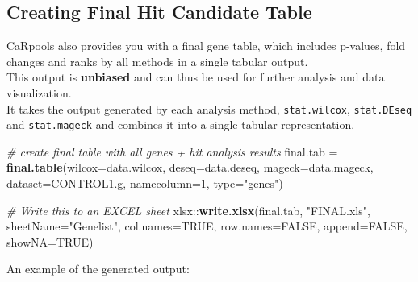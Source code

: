 \documentclass[]{article}
\newenvironment{Shaded}{\begin{snugshade}}{\end{snugshade}}
\newcommand{\KeywordTok}[1]{\textcolor[rgb]{0.13,0.29,0.53}{\textbf{{#1}}}}
\newcommand{\DataTypeTok}[1]{\textcolor[rgb]{0.13,0.29,0.53}{{#1}}}
\newcommand{\DecValTok}[1]{\textcolor[rgb]{0.00,0.00,0.81}{{#1}}}
\newcommand{\StringTok}[1]{\textcolor[rgb]{0.31,0.60,0.02}{{#1}}}
\newcommand{\CommentTok}[1]{\textcolor[rgb]{0.56,0.35,0.01}{\textit{{#1}}}}
\newcommand{\OtherTok}[1]{\textcolor[rgb]{0.56,0.35,0.01}{{#1}}}
\newcommand{\NormalTok}[1]{{#1}}
\begin{document}
\subsection{Creating Final Hit Candidate
Table}\label{creating-final-hit-candidate-table}

CaRpools also provides you with a final gene table, which includes
p-values, fold changes and ranks by all methods in a single tabular
output.\\
This output is \textbf{unbiased} and can thus be used for further
analysis and data visualization.\\
It takes the output generated by each analysis method,
\texttt{stat.wilcox}, \texttt{stat.DEseq} and \texttt{stat.mageck} and
combines it into a single tabular representation.

\begin{Shaded}
\begin{Highlighting}[]
\CommentTok{# create final table with all genes + hit analysis results}
\NormalTok{final.tab =}\StringTok{ }\KeywordTok{final.table}\NormalTok{(}\DataTypeTok{wilcox=}\NormalTok{data.wilcox, }\DataTypeTok{deseq=}\NormalTok{data.deseq, }\DataTypeTok{mageck=}\NormalTok{data.mageck, }\DataTypeTok{dataset=}\NormalTok{CONTROL1.g, }\DataTypeTok{namecolumn=}\DecValTok{1}\NormalTok{, }\DataTypeTok{type=}\StringTok{"genes"}\NormalTok{)}

\CommentTok{# Write this to an EXCEL sheet}
\NormalTok{xlsx::}\KeywordTok{write.xlsx}\NormalTok{(final.tab, }\StringTok{"FINAL.xls"}\NormalTok{, }\DataTypeTok{sheetName=}\StringTok{"Genelist"}\NormalTok{, }
  \DataTypeTok{col.names=}\OtherTok{TRUE}\NormalTok{, }\DataTypeTok{row.names=}\OtherTok{FALSE}\NormalTok{, }\DataTypeTok{append=}\OtherTok{FALSE}\NormalTok{, }\DataTypeTok{showNA=}\OtherTok{TRUE}\NormalTok{)}
\end{Highlighting}
\end{Shaded}

An example of the generated output:
\end{document}
